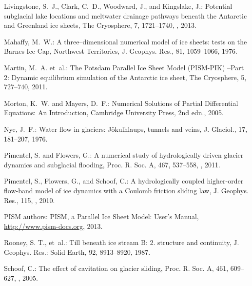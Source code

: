 \documentclass[gmd]{copernicus}   %
\begin{document}
\begin{thebibliography}{67}
Livingstone, S.~J., Clark, C.~D., Woodward, J., and Kingslake, J.: Potential
  subglacial lake locations and meltwater drainage pathways beneath the
  {A}ntarctic and {G}reenland ice sheets, The Cryosphere, 7, 1721--1740,
  , 2013.

Mahaffy, M.~W.: A three--dimensional numerical model of ice sheets: tests on
  the {B}arnes {I}ce {C}ap, {N}orthwest {T}erritories, J. Geophys. Res., 81,
  1059--1066, 1976.

Martin, M.~A. et~al.: The {P}otsdam {P}arallel {I}ce {S}heet
  {M}odel ({PISM-PIK}) --{P}art 2: {D}ynamic equilibrium simulation of the
  {A}ntarctic ice sheet, The Cryosphere, 5, 727--740, 2011.

Morton, K.~W. and Mayers, D.~F.: Numerical {S}olutions of {P}artial
  {D}ifferential {E}quations: {A}n {I}ntroduction, Cambridge University Press,
  2nd edn., 2005.

Nye, J.~F.: Water flow in glaciers: {J}\"okulhlaups, tunnels and veins, J.
  Glaciol., 17, 181--207, 1976.

Pimentel, S. and Flowers, G.: A numerical study of hydrologically driven
  glacier dynamics and subglacial flooding, Proc. R. Soc. A, 467, 537--558,
  , 2011.

Pimentel, S., Flowers, G., and Schoof, C.: A hydrologically coupled
  higher-order flow-band model of ice dynamics with a {C}oulomb friction
  sliding law, J. Geophys. Res., 115, , 2010.

{PISM authors}: {PISM}, a {P}arallel {I}ce {S}heet {M}odel: {U}ser's {M}anual,
  \url{http://www.pism-docs.org}, 2013.

Rooney, S. T., et~al.: Till beneath ice stream {B}: 2. structure and continuity,
  J. Geophys. Res.: Solid Earth, 92, 8913--8920, 1987.

Schoof, C.: The effect of cavitation on glacier sliding, Proc. R. Soc. A, 461,
  609--627, , 2005.


\end{thebibliography}
\end{document}
